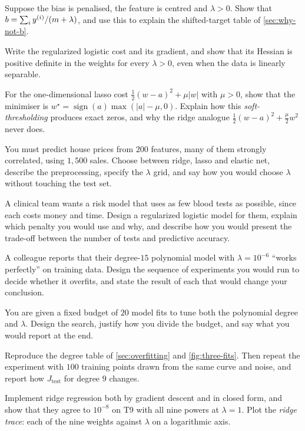\ap Suppose the bias is penalised, the feature is centred and $\lambda > 0$.
Show that $b = \sum_iy^{(i)}/(m+\lambda)$, and use this to explain the
shifted-target table of \cref{sec:why-not-b}.

\ap Write the regularized logistic cost and its gradient, and show that its
Hessian is positive definite in the weights for every $\lambda > 0$, even when
the data is linearly separable.

\ap For the one-dimensional lasso cost
$\frac12(w - a)^2 + \mu|w|$ with $\mu > 0$, show that the minimiser is
$w^\star = \operatorname{sign}(a)\max(|a| - \mu, 0)$. Explain how this
\emph{soft-thresholding} produces exact zeros, and why the ridge analogue
$\frac12(w-a)^2 + \frac{\mu}{2}w^2$ never does.


\dpr You must predict house prices from $200$ features, many of them strongly
correlated, using $1{,}500$ sales. Choose between ridge, lasso and elastic net,
describe the preprocessing, specify the $\lambda$ grid, and say how you would
choose $\lambda$ without touching the test set.

\dpr A clinical team wants a risk model that uses as few blood tests as possible,
since each costs money and time. Design a regularized logistic model for them,
explain which penalty you would use and why, and describe how you would present
the trade-off between the number of tests and predictive accuracy.

\dpr A colleague reports that their degree-$15$ polynomial model with
$\lambda = 10^{-6}$ ``works perfectly'' on training data. Design the sequence of
experiments you would run to decide whether it overfits, and state the result of
each that would change your conclusion.

\dpr You are given a fixed budget of $20$ model fits to tune both the polynomial
degree and $\lambda$. Design the search, justify how you divide the budget, and
say what you would report at the end.


\pe Reproduce the degree table of \cref{sec:overfitting} and
\cref{fig:three-fits}. Then repeat the experiment with $100$ training points
drawn from the same curve and noise, and report how $J_{\text{test}}$ for degree
$9$ changes.

\pe Implement ridge regression both by gradient descent and in closed form, and
show that they agree to $10^{-8}$ on T9 with all nine powers at $\lambda = 1$.
Plot the \emph{ridge trace}: each of the nine weights against $\lambda$ on a
logarithmic axis.

